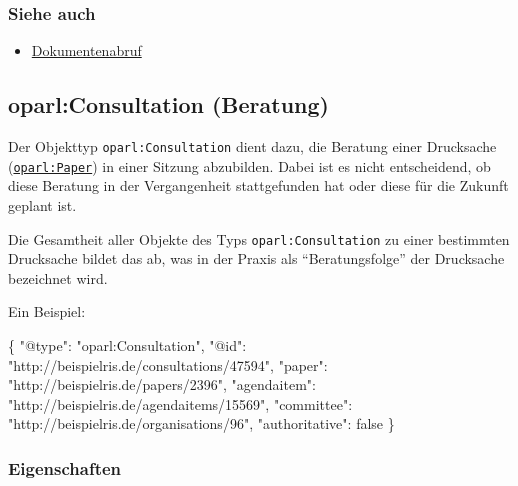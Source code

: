 \documentclass[,a4paper]{article}
\newenvironment{Shaded}{}{}
\newcommand{\DataTypeTok}[1]{\textcolor[rgb]{0.56,0.13,0.00}{{#1}}}
\newcommand{\DecValTok}[1]{\textcolor[rgb]{0.25,0.63,0.44}{{#1}}}
\newcommand{\StringTok}[1]{\textcolor[rgb]{0.25,0.44,0.63}{{#1}}}
\newcommand{\NormalTok}[1]{{#1}}
\begin{document}
\subsubsection{Siehe auch}\label{siehe-auch}

\begin{itemize}
\itemsep1pt\parskip0pt
\item
  \hyperref[dokumentenabruf]{Dokumentenabruf}
\end{itemize}

\subsection{oparl:Consultation (Beratung)}\label{oparlux5fconsultation}

Der Objekttyp \texttt{oparl:Consultation} dient dazu, die Beratung einer
Drucksache (\hyperref[oparlux5fpaper]{\texttt{oparl:Paper}}) in einer
Sitzung abzubilden. Dabei ist es nicht entscheidend, ob diese Beratung
in der Vergangenheit stattgefunden hat oder diese für die Zukunft
geplant ist.

Die Gesamtheit aller Objekte des Typs \texttt{oparl:Consultation} zu
einer bestimmten Drucksache bildet das ab, was in der Praxis als
``Beratungsfolge'' der Drucksache bezeichnet wird.

Ein Beispiel:

\begin{Shaded}
\begin{Highlighting}[]
\NormalTok{\{}
    \DataTypeTok{"@type"}\NormalTok{: }\StringTok{"oparl:Consultation"}\NormalTok{,}
    \DataTypeTok{"@id"}\NormalTok{: }\StringTok{"http://beispielris.de/consultations/47594"}\NormalTok{,}
    \DataTypeTok{"paper"}\NormalTok{: }\StringTok{"http://beispielris.de/papers/2396"}\NormalTok{,}
    \DataTypeTok{"agendaitem"}\NormalTok{: }\StringTok{"http://beispielris.de/agendaitems/15569"}\NormalTok{,}
    \DataTypeTok{"committee"}\NormalTok{: }\StringTok{"http://beispielris.de/organisations/96"}\NormalTok{,}
    \DataTypeTok{"authoritative"}\NormalTok{: }\DecValTok{false}
\NormalTok{\}}
\end{Highlighting}
\end{Shaded}

\subsubsection{Eigenschaften}\label{eigenschaften-8}
\end{document}
